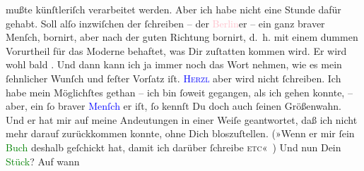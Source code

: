                mußte künſtleriſch verarbeitet werden. Aber ich habe nicht eine Stunde dafür gehabt.
               Soll alſo inzwiſchen der \label{K_L02704-12v}\label{K_L02704-12h} ſchreiben – der \textcolor{pink}{Berlin}{}\ledrightnote{\textcolor{pink}{Berlin}}er – ein ganz braver Menſch,  bornirt, aber nach der guten Richtung bornirt, d. h. mit einem dummen
               Vorurtheil für das Moderne be{\pb}haftet, was Dir
               zuſtatten kommen wird. Er wird wohl bald \label{K_L02704-13v}\label{K_L02704-13h}. Und dann kann ich ja immer noch das Wort nehmen, wie es
               mein ſehnlicher Wunſch und feſter Vorſatz iſt. \textsc{\textcolor{blue}{Herzl}{}\ledrightnote{\textcolor{blue}{Theodor Herzl}}} aber wird nicht ſchreiben. Ich habe mein Möglichſtes gethan – ich bin ſoweit
               gegangen, als ich gehen konnte, – aber, ein ſo braver \textcolor{blue}{Menſch}{} er iſt, ſo kennſt Du doch auch
               ſeinen {\pb}Größenwahn. Und er hat mir auf meine
               Andeutungen in einer Weiſe geantwortet, daß ich nicht mehr darauf zurückkommen
               konnte, ohne Dich bloszuſtellen. (»Wenn er mir ſein \textcolor{green}{Buch}{} deshalb geſchickt hat, damit ich darüber ſchreibe \textsc{etc}« {\dotsfour})\pend
           \pstart
           Und nun Dein \textcolor{green}{Stück}{}? Auf wann
